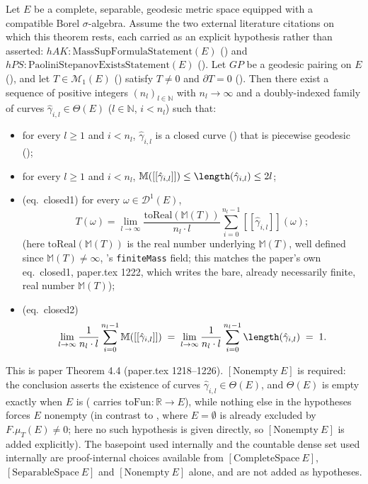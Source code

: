 \begin{theorem}\label{bbassertion}
  Let $E$ be a complete, separable, geodesic metric space equipped with a compatible Borel
  $\sigma$-algebra. Assume the two external literature citations on which this theorem rests, each
  carried as an explicit hypothesis rather than asserted: $hAK \colon
  \mathrm{MassSupFormulaStatement}(E)$ () and $hPS \colon
  \mathrm{PaoliniStepanovExistsStatement}(E)$ (). Let $GP$ be a
  geodesic pairing on $E$ (), and let
  $T \in \mathcal{M}_1(E)$ () satisfy $T \neq 0$ and $\partial T = 0$
  (). Then there exist a sequence of positive integers $(n_l)_{l\in\mathbb N}$
  with $n_l\to\infty$ and a doubly-indexed family of curves $\hat\gamma_{i,l}\in\Theta(E)$
  ($l\in\mathbb N$, $i<n_l$) such that:
  \begin{itemize}
    \item[(a)] for every $l\ge1$ and $i<n_l$, $\hat\gamma_{i,l}$ is a closed curve
      () that is piecewise geodesic ();
    \item[(b)] for every $l\ge1$ and $i<n_l$, $\mathbb{M}([[\hat\gamma_{i,l}]]) \le
      \length(\hat\gamma_{i,l}) \le 2l$;
    \item[(c)] (eq.~closed1) for every $\omega\in\mathcal D^1(E)$,
      \[
        T(\omega) = \lim_{l\to\infty} \frac{\mathrm{toReal}(\mathbb M(T))}{n_l\cdot l}\sum_{i=0}^{n_l-1}
          [[\hat\gamma_{i,l}]](\omega)
        ;
      \]
      (here $\mathrm{toReal}(\mathbb M(T))$ is the real number underlying $\mathbb M(T)$, well
      defined since $\mathbb M(T)\ne\infty$, 's \texttt{finiteMass} field;
      this matches the paper's own eq.~closed1, paper.tex 1222, which writes the bare, already
      necessarily finite, real number $\mathbb M(T)$);
    \item[(d)] (eq.~closed2)
      \[
        \lim_{l\to\infty}\frac1{n_l\cdot l}\sum_{i=0}^{n_l-1}\mathbb M([[\hat\gamma_{i,l}]])
        \;=\;
        \lim_{l\to\infty}\frac1{n_l\cdot l}\sum_{i=0}^{n_l-1}\length(\hat\gamma_{i,l})
        \;=\;1
        .
      \]
  \end{itemize}

  This is paper Theorem 4.4 (paper.tex 1218--1226). $[\mathrm{Nonempty}\ E]$ is required: the
  conclusion asserts the existence of curves $\hat\gamma_{i,l}\in\Theta(E)$, and $\Theta(E)$ is
  empty exactly when $E$ is ( carries $\mathrm{toFun}\colon\mathbb R\to E$), while
  nothing else in the hypotheses forces $E$ nonempty (in contrast to
  , where $E=\emptyset$ is already excluded by $F.\mu_T(E)\ne0$; here
  no such hypothesis is given directly, so $[\mathrm{Nonempty}\ E]$ is added explicitly). The
  basepoint used internally and the countable dense set used internally are proof-internal choices
  available from $[\mathrm{CompleteSpace}\ E]$, $[\mathrm{SeparableSpace}\ E]$ and
  $[\mathrm{Nonempty}\ E]$ alone, and are not added as hypotheses.


\end{theorem}
